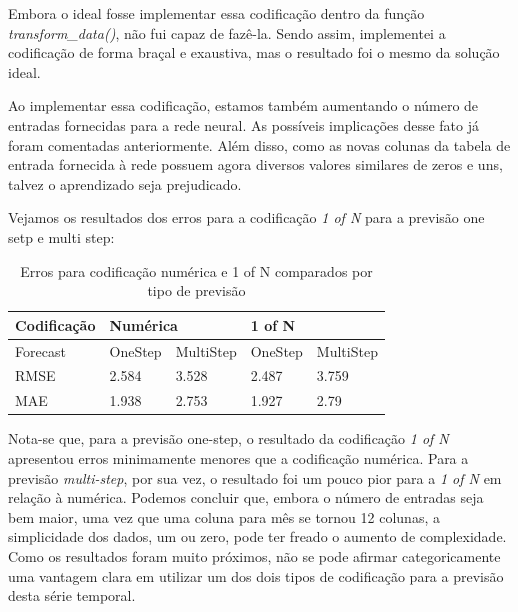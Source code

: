 \documentclass[12pt]{article}
\begin{document}
	Embora o ideal fosse implementar essa codificação dentro da função \textit{transform\_data()}, não fui capaz de fazê-la. Sendo assim, implementei a codificação de forma braçal e exaustiva, mas o resultado foi o mesmo da solução ideal.
	
	Ao implementar essa codificação, estamos também aumentando o número de entradas fornecidas para a rede neural. As possíveis implicações desse fato já foram comentadas anteriormente. Além disso, como as novas colunas da tabela de entrada fornecida à rede possuem agora diversos valores similares de zeros e uns, talvez o aprendizado seja prejudicado.
	
	Vejamos os resultados dos erros para a codificação \textit{1 of N} para a previsão one setp e multi step:
	
	\begin{table}[H]
		\centering
		\begin{tabular}{|l|l|l|l|l|}
			\hline
			Codificação & \multicolumn{2}{l|}{Numérica} & \multicolumn{2}{l|}{1 of N} \\ \hline
			Forecast    & OneStep      & MultiStep      & OneStep     & MultiStep     \\ \hline
			RMSE        & 2.584        & 3.528          & 2.487       & 3.759         \\ \hline
			MAE         & 1.938        & 2.753          & 1.927       & 2.79          \\ \hline
		\end{tabular}
	\caption{Erros para codificação numérica e 1 of N comparados por tipo de previsão}
	\end{table}
	
	Nota-se que, para a previsão one-step, o resultado da codificação \textit{1 of N} apresentou erros minimamente menores que a codificação numérica. Para a previsão \textit{multi-step}, por sua vez, o resultado foi um pouco pior para a \textit{1 of N} em relação à numérica. Podemos concluir que, embora o número de entradas seja bem maior, uma vez que uma coluna para mês se tornou 12 colunas, a simplicidade dos dados, um ou zero, pode ter freado o aumento de complexidade. Como os resultados foram muito próximos, não se pode afirmar categoricamente uma vantagem clara em utilizar um dos dois tipos de codificação para a previsão desta série temporal.
	
	 
	
\end{document}
